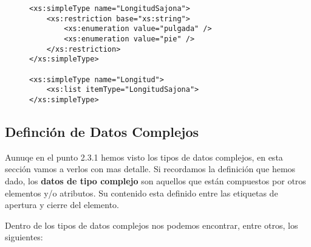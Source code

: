 \begin{itemize}
    \begin{figure}[H]
        \begin{tcolorbox}[sharp corners, colback=yellow!30, colframe=white!20]
            \scriptsize
            \begin{verbatim}
<xs:simpleType name="LongitudSajona">
    <xs:restriction base="xs:string">
        <xs:enumeration value="pulgada" />
        <xs:enumeration value="pie" />
    </xs:restriction>
</xs:simpleType>

<xs:simpleType name="Longitud">
    <xs:list itemType="LongitudSajona">
</xs:simpleType>
            \end{verbatim}
        \end{tcolorbox}
    \end{figure}
\end{itemize}

\subsection{Definción de Datos Complejos}
Aunuqe en el punto 2.3.1 hemos visto los tipos de datos complejos, en esta sección vamos a verlos con mas detalle. Si recordamos la definición que hemos dado, los \textbf{datos de tipo complejo} son aquellos que están compuestos por otros elementos y/o atributos. Su contenido esta definido entre las etiquetas de apertura y cierre del elemento.

Dentro de los tipos de datos complejos nos podemos encontrar, entre otros, los siguientes:

